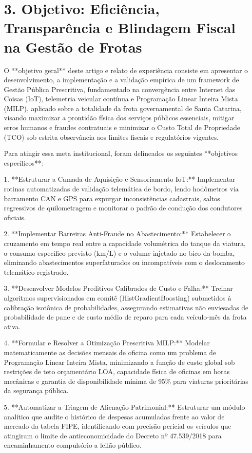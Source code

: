 \documentclass[10pt,a4paper,journal]{article}
\begin{document}
\section{3. Objetivo: Eficiência, Transparência e Blindagem Fiscal na Gestão de Frotas}
O **objetivo geral** deste artigo e relato de experiência consiste em apresentar o desenvolvimento, a implementação e a validação empírica de um framework de Gestão Pública Prescritiva, fundamentado na convergência entre Internet das Coisas (IoT), telemetria veicular contínua e Programação Linear Inteira Mista (MILP), aplicado sobre a totalidade da frota governamental de Santa Catarina, visando maximizar a prontidão física dos serviços públicos essenciais, mitigar erros humanos e fraudes contratuais e minimizar o Custo Total de Propriedade (TCO) sob estrita observância aos limites fiscais e regulatórios vigentes.

Para atingir essa meta institucional, foram delineados os seguintes **objetivos específicos**:

1. **Estruturar a Camada de Aquisição e Sensoriamento IoT:** Implementar rotinas automatizadas de validação telemática de bordo, lendo hodômetros via barramento CAN e GPS para expurgar inconsistências cadastrais, saltos regressivos de quilometragem e monitorar o padrão de condução dos condutores oficiais.

2. **Implementar Barreiras Anti-Fraude no Abastecimento:** Estabelecer o cruzamento em tempo real entre a capacidade volumétrica do tanque da viatura, o consumo específico previsto (km/L) e o volume injetado no bico da bomba, eliminando abastecimentos superfaturados ou incompatíveis com o deslocamento telemático registrado.

3. **Desenvolver Modelos Preditivos Calibrados de Custo e Falha:** Treinar algoritmos supervisionados em comitê (HistGradientBoosting) submetidos à calibração isotônica de probabilidades, assegurando estimativas não enviesadas de probabilidade de pane e de custo médio de reparo para cada veículo-mês da frota ativa.

4. **Formular e Resolver a Otimização Prescritiva MILP:** Modelar matematicamente as decisões mensais de oficina como um problema de Programação Linear Inteira Mista, minimizando a função de custo global sob restrições de teto orçamentário LOA, capacidade física de oficinas em horas mecânicas e garantia de disponibilidade mínima de 95\% para viaturas prioritárias da segurança pública.

5. **Automatizar a Triagem de Alienação Patrimonial:** Estruturar um módulo analítico que audite o histórico de despesas acumuladas frente ao valor de mercado da tabela FIPE, identificando com precisão pericial os veículos que atingiram o limite de antieconomicidade do Decreto nº 47.539/2018 para encaminhamento compulsório a leilão público.
\end{document}
